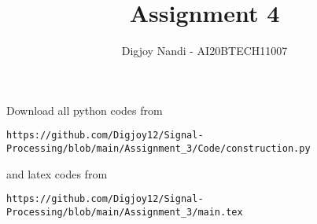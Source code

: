 \documentclass[journal,12pt,twocolumn]{IEEEtran}
\DeclareMathOperator*{\Res}{Res}
\begin{document}
\newcommand{\BEQA}{\begin{eqnarray}}
\newcommand{\EEQA}{\end{eqnarray}}
\newcommand{\define}{\stackrel{\triangle}{=}}

\raggedbottom
\setlength{\parindent}{0pt}
\providecommand{\mbf}{\mathbf}
\providecommand{\pr}[1]{\ensuremath{\Pr\left(#1\right)}}
\providecommand{\qfunc}[1]{\ensuremath{Q\left(#1\right)}}
\providecommand{\sbrak}[1]{\ensuremath{{}\left[#1\right]}}
\providecommand{\lsbrak}[1]{\ensuremath{{}\left[#1\right.}}
\providecommand{\rsbrak}[1]{\ensuremath{{}\left.#1\right]}}
\providecommand{\brak}[1]{\ensuremath{\left(#1\right)}}
\providecommand{\lbrak}[1]{\ensuremath{\left(#1\right.}}
\providecommand{\rbrak}[1]{\ensuremath{\left.#1\right)}}
\providecommand{\cbrak}[1]{\ensuremath{\left\{#1\right\}}}
\providecommand{\lcbrak}[1]{\ensuremath{\left\{#1\right.}}
\providecommand{\rcbrak}[1]{\ensuremath{\left.#1\right\}}}
\theoremstyle{remark}
\newtheorem{rem}{Remark}
\newcommand{\sgn}{\mathop{\mathrm{sgn}}}
\providecommand{\abs}[1]{\vert#1\vert}
\providecommand{\res}[1]{\Res\displaylimits_{#1}} 
\providecommand{\norm}[1]{\lVert#1\rVert}
\providecommand{\mtx}[1]{\mathbf{#1}}
\providecommand{\mean}[1]{E[ #1 ]}
\providecommand{\fourier}{\overset{\mathcal{F}}{ \rightleftharpoons}}
\providecommand{\system}{\overset{\mathcal{H}}{ \longleftrightarrow}}
\newcommand{\solution}{\noindent \textbf{Solution: }}
\newcommand{\cosec}{\,\text{cosec}\,}
\providecommand{\dec}[2]{\ensuremath{\overset{#1}{\underset{#2}{\gtrless}}}}
\newcommand{\myvec}[1]{\ensuremath{\begin{pmatrix}#1\end{pmatrix}}}
\newcommand{\mydet}[1]{\ensuremath{\begin{vmatrix}#1\end{vmatrix}}}
\makeatletter
{}
\makeatother
\let\StandardTheFigure\thefigure
\let\vec\mathbf
\renewcommand{\thefigure}{\theproblem}
\def\putbox#1#2#3{\makebox[0in][l]{\makebox[#1][l]{}\raisebox{\baselineskip}[0in][0in]{\raisebox{#2}[0in][0in]{#3}}}}
     \def\rightbox#1{\makebox[0in][r]{#1}}
     \def\centbox#1{\makebox[0in]{#1}}
     \def\topbox#1{\raisebox{-\baselineskip}[0in][0in]{#1}}
     \def\midbox#1{\raisebox{-0.5\baselineskip}[0in][0in]{#1}}
\vspace{3cm}
\title{Assignment 4}
\author{Digjoy Nandi - AI20BTECH11007}
\maketitle
\newpage
\bigskip
\renewcommand{\thefigure}{\theenumi}
\renewcommand{\thetable}{\theenumi}
Download all python codes from 
\begin{lstlisting}
https://github.com/Digjoy12/Signal-Processing/blob/main/Assignment_3/Code/construction.py
\end{lstlisting}
%
and latex codes from 
%
\begin{lstlisting}
https://github.com/Digjoy12/Signal-Processing/blob/main/Assignment_3/main.tex
\end{lstlisting}
\end{document}
